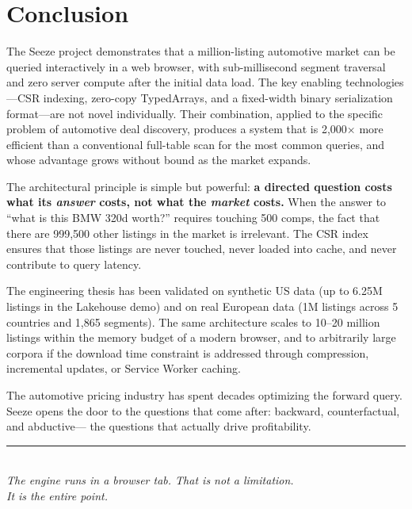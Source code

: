 \documentclass[11pt,a4paper,twoside]{book}
\begin{document}
\section{Conclusion}

The Seeze project demonstrates that a million-listing automotive market can be queried
interactively in a web browser, with sub-millisecond segment traversal and zero server
compute after the initial data load. The key enabling technologies---CSR indexing, zero-copy
TypedArrays, and a fixed-width binary serialization format---are not novel individually.
Their combination, applied to the specific problem of automotive deal discovery, produces
a system that is 2,000$\times$ more efficient than a conventional full-table scan for the
most common queries, and whose advantage grows without bound as the market expands.

The architectural principle is simple but powerful: \textbf{a directed question costs what
its \textit{answer} costs, not what the \textit{market} costs.} When the answer to ``what is
this BMW 320d worth?'' requires touching 500 comps, the fact that there are 999,500 other
listings in the market is irrelevant. The CSR index ensures that those listings are never
touched, never loaded into cache, and never contribute to query latency.

The engineering thesis has been validated on synthetic US data (up to 6.25M listings in the
Lakehouse demo) and on real European data (1M listings across 5 countries and 1,865 segments).
The same architecture scales to 10--20 million listings within the memory budget of a modern
browser, and to arbitrarily large corpora if the download time constraint is addressed through
compression, incremental updates, or Service Worker caching.

The automotive pricing industry has spent decades optimizing the forward query. Seeze opens
the door to the questions that come after: backward, counterfactual, and abductive---
the questions that actually drive profitability.

\vspace{24pt}
\begin{center}
\rule{0.4\textwidth}{0.5pt}\\[8pt]
{\small\textit{The engine runs in a browser tab. That is not a limitation.\\
It is the entire point.}}
\end{center}

\appendix
\end{document}
